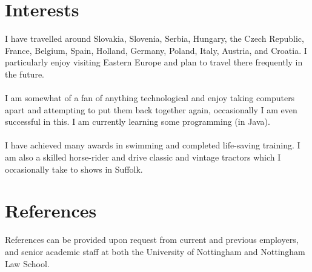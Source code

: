\documentclass[a4paper, 10pt, oneside]{article}
\begin{document}
\begin{center}
\begin{minipage}[t]{0.48\textwidth}
\end{minipage} %



\section{Interests}
\begin{flushleft}
I have travelled around Slovakia, Slovenia, Serbia, Hungary, the Czech Republic, France, Belgium, Spain, Holland, Germany, Poland, Italy, Austria, and Croatia. I particularly enjoy visiting Eastern Europe and plan to travel there frequently in the future.

\paragraph*{}
I am somewhat of a fan of anything technological and enjoy taking computers apart and attempting to put them back together again, occasionally I am even successful in this. I am currently learning some programming (in \textsf{Java}).

\paragraph*{}
I have achieved many awards in swimming and completed life-saving training. I am also a skilled horse-rider and drive classic and vintage tractors which I occasionally take to shows in Suffolk.
\end{flushleft}

\section{References}
\begin{flushleft}
References can be provided upon request from current and previous employers, and senior academic staff at both the University of Nottingham and Nottingham Law School.
\end{flushleft}

\end{center}
\end{document}
